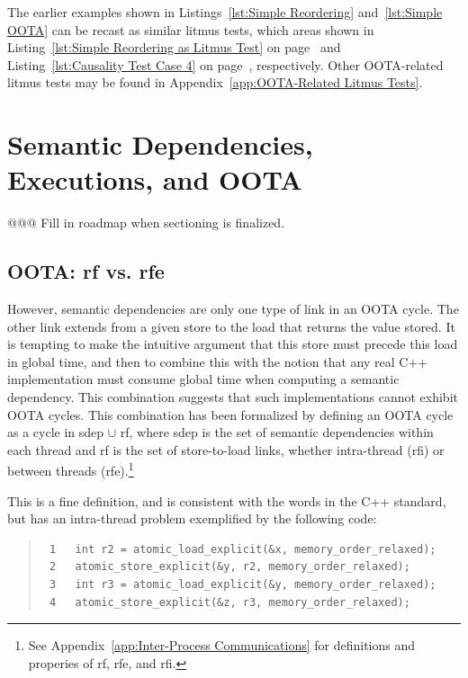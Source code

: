 \documentclass[10]{article}
\begin{document}
The earlier examples shown in
Listings~\ref{lst:Simple Reordering}
and~\ref{lst:Simple OOTA}
can be recast as similar  litmus tests, which areas shown in
Listing~\ref{lst:Simple Reordering as Litmus Test}
on page~\pageref{lst:Simple Reordering as Litmus Test}
and Listing~\ref{lst:Causality Test Case 4}
on page~\pageref{lst:Causality Test Case 4}, respectively.
Other OOTA-related litmus tests may be found in
Appendix~\ref{app:OOTA-Related Litmus Tests}.

\section{Semantic Dependencies, Executions, and OOTA}
\label{sec:Semantic Dependencies; Executions; and OOTA}

@@@ Fill in roadmap when sectioning is finalized.

\subsection{OOTA: rf vs. rfe}
\label{sec:OOTA: rf vs. rfe}

However, semantic dependencies are only one type of link in an OOTA cycle.
The other link extends from a given store to the load that returns the
value stored.
It is tempting to make the intuitive argument that this store must precede
this load in global time, and then to combine this with the notion that
any real C++ implementation must consume global time when computing a
semantic dependency.
This combination suggests that such implementations cannot exhibit
OOTA cycles.
This combination has been formalized by defining an OOTA cycle as a cycle
in sdep $\cup$ rf, where sdep is the set of semantic dependencies within
each thread and rf is the set of store-to-load links, whether intra-thread
(rfi) or between threads (rfe).\footnote{
	See Appendix~\ref{app:Inter-Process Communications} for definitions
	and properies of rf, rfe, and rfi.}

This is a fine definition, and is consistent with the words in the C++
standard, but has an intra-thread problem exemplified by the following
code:

\begin{quote}
\scriptsize
\begin{verbatim}
 1   int r2 = atomic_load_explicit(&x, memory_order_relaxed);
 2   atomic_store_explicit(&y, r2, memory_order_relaxed);
 3   int r3 = atomic_load_explicit(&y, memory_order_relaxed);
 4   atomic_store_explicit(&z, r3, memory_order_relaxed);
\end{verbatim}
\end{quote}
\end{document}
